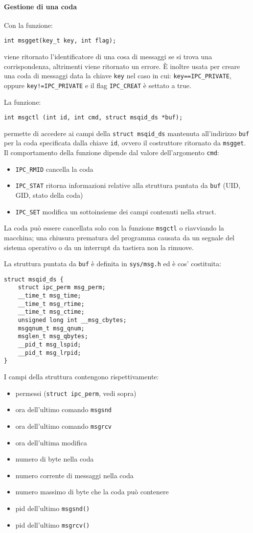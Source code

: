 \documentclass[a4paper]{article}
\begin{document}
\paragraph{Gestione di una coda}
Con la funzione:
\begin{verbatim}
int msgget(key_t key, int flag);
\end{verbatim}
viene ritornato l'identificatore di una cosa di messaggi se si trova una corrispondenza, altrimenti viene ritornato un errore.
È inoltre usata per creare una coda di messaggi data la chiave \verb|key| nel caso in cui:
\verb|key==IPC_PRIVATE|, oppure \verb|key!=IPC_PRIVATE| e il flag  \verb|IPC_CREAT| è settato a true.

La funzione:
\begin{verbatim}
int msgctl (int id, int cmd, struct msqid_ds *buf);
\end{verbatim}
permette di accedere ai campi della \verb|struct msqid_ds|  mantenuta all'indirizzo \verb|buf| per la coda specificata dalla chiave \verb|id|, ovvero il costruttore ritornato da \verb|msgget|.
Il comportamento della funzione dipende dal valore dell'argomento \verb|cmd|:
\begin{itemize}
\item \verb|IPC_RMID| cancella la coda
\item \verb|IPC_STAT| ritorna informazioni relative alla struttura puntata da \verb|buf| (UID, GID, stato della coda)
\item \verb|IPC_SET| modifica un sottoinsieme dei campi contenuti nella struct.
\end{itemize}
La coda può essere cancellata solo con la funzione \verb|msgctl| o riavviando la macchina; una chiusura prematura del programma causata da un segnale del sistema operativo o da un interrupt da tastiera non la rimuove.

La struttura puntata da \verb|buf| è definita in \verb|sys/msg.h| ed è cos' costituita:
\begin{verbatim}
struct msqid_ds {
    struct ipc_perm msg_perm;
    __time_t msg_time;
    __time_t msg_rtime;
    __time_t msg_ctime;
    unsigned long int __msg_cbytes;
    msgqnum_t msg_qnum;
    msglen_t msg_qbytes;
    __pid_t msg_lspid;
    __pid_t msg_lrpid;
}
\end{verbatim}
I campi della struttura contengono rispettivamente:
\begin{itemize}
\item permessi (\verb|struct ipc_perm|, vedi sopra)
\item ora dell'ultimo comando \verb|msgsnd|
\item ora dell'ultimo comando \verb|msgrcv|
\item ora dell'ultima modifica
\item numero di byte nella coda
\item numero corrente di messaggi nella coda
\item numero massimo di byte che la coda può contenere
\item pid dell'ultimo \verb|msgsnd()|
\item pid dell'ultimo \verb|msgrcv()|
\end{itemize}
\end{document}
